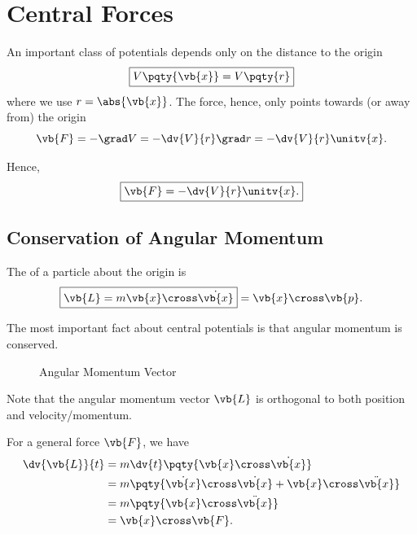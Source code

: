 \section{Central Forces}

An important class of potentials depends only on the distance to the origin
\begin{equation}
    \boxed{V\pqty{\vb{x}} = V\pqty{r}}
\end{equation}
where we use \(r = \abs{\vb{x}}\). The force, hence, only points towards (or away from) the origin
\begin{equation}
    \vb{F} = - \grad V = - \dv{V}{r} \grad r = - \dv{V}{r} \unitv{x}.
\end{equation}

Hence,
\begin{equation}
    \boxed{\vb{F} = - \dv{V}{r} \unitv{x}.}
\end{equation}

\subsection{Conservation of Angular Momentum}

\begin{definition}
    \label{def:angular-momentum}%
    The  of a particle about  the origin is
    \begin{equation}
        \boxed{\vb{L} = m \vb{x} \cross \dot{\vb{x}}} = \vb{x} \cross \vb{p}.
    \end{equation}
\end{definition}

The most important fact about central potentials is that angular momentum is conserved.

\begin{figure}[ht!]
    \centering

    \caption{Angular Momentum Vector}
    \label{fig:ang-momentum-vector}%
\end{figure}

Note that the angular momentum vector \(\vb{L}\) is orthogonal to both position and velocity/momentum.

For a general force \(\vb{F}\), we have
\begin{subequations}\begin{align}
    \dv{\vb{L}}{t} &= m \dv{t} \pqty{\vb{x} \cross \dot{\vb{x}}} \\
    &= m \pqty{\dot{\vb{x}} \cross \dot{\vb{x}} + \vb{x} \cross \ddot{\vb{x}}} \\
    &= m \pqty{\vb{x} \cross \ddot{\vb{x}}} \\
    &= \vb{x} \cross \vb{F}.
\end{align}\end{subequations}

